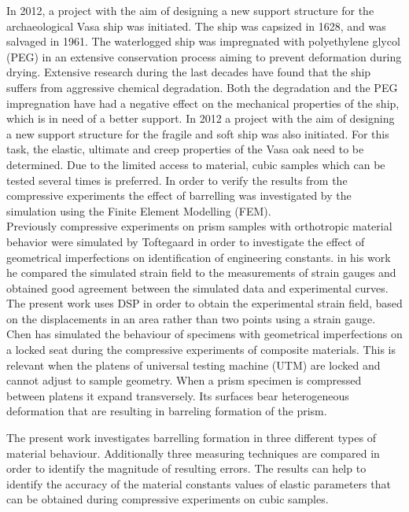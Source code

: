 \documentclass[review]{elsarticle}
\begin{document}
In 2012, a project with the aim of designing a new support structure for the
archaeological Vasa ship was initiated. The ship was capsized in 1628, and was salvaged in 1961. 
The waterlogged ship was impregnated with polyethylene glycol (PEG) in an extensive conservation process aiming to prevent deformation during drying. 
Extensive research during the last decades have found that the ship suffers from
aggressive chemical degradation. Both the degradation \cite{bjurhager2012state}
and the PEG impregnation \cite{ljungdahl2007transverse} have had a negative effect on the mechanical properties of the ship, which is in need of a better support. In 2012 a project with the aim of 
designing a new support structure for the fragile and soft ship was also initiated. For this task, the elastic, ultimate and creep properties of the 
Vasa oak need to be determined. Due to the limited access to material, cubic samples which can be tested several times is preferred.
In order to verify the results from the compressive experiments the effect of
barrelling was investigated by the simulation using the Finite Element
Modelling (FEM).\\
Previously compressive experiments on prism samples with orthotropic material
behavior were simulated by Toftegaard \cite{Toftegaard1999849} in order to
investigate the effect of geometrical imperfections on identification of engineering constants. 
in his work he compared the simulated strain field to the measurements of strain
gauges and obtained good agreement between the simulated data and experimental
curves.\\
The present work uses DSP in order to obtain the experimental strain field,
based on the displacements in an area rather than two points using a strain
gauge.
Chen \cite{Chen001} has simulated the behaviour of specimens with geometrical
imperfections on a locked  seat during the compressive experiments
of composite materials. This is relevant when the platens of universal testing
machine (UTM) are locked and cannot adjust to sample geometry.
When a prism specimen is compressed between platens it expand transversely.
Its surfaces bear heterogeneous deformation that are resulting in barreling
formation of the prism. 




The present work investigates
barrelling formation in three different types of material behaviour.
Additionally three measuring techniques are compared in order to identify the magnitude of
resulting errors.
The results can help to identify the accuracy of the material constants values
of elastic parameters that can be obtained during compressive experiments on
cubic samples.
\end{document}
